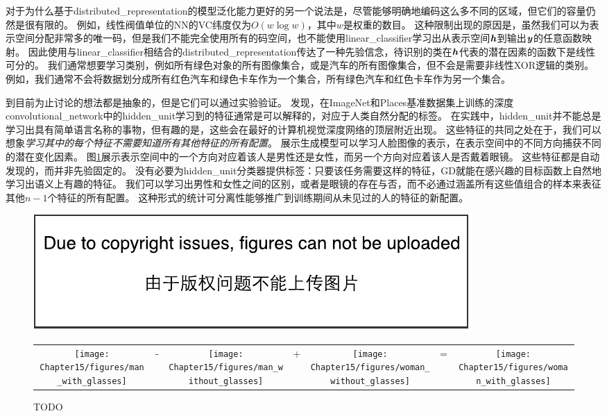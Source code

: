 对于为什么基于\gls{distributed_representation}的模型泛化能力更好的另一个说法是，尽管能够明确地编码这么多不同的区域，但它们的容量仍然是很有限的。
例如，线性阀值单位的\gls{NN}的VC纬度仅为$O(w\log w)$，其中$w$是权重的数目\citep{sontag1998vc}。
这种限制出现的原因是，虽然我们可以为表示空间分配非常多的唯一码，但是我们不能完全使用所有的码空间，也不能使用\gls{linear_classifier}学习出从表示空间$\boldsymbol{\mathit{h}}$到输出$\boldsymbol{\mathit{y}}$的任意函数映射。
因此使用与\gls{linear_classifier}相结合的\gls{distributed_representation}传达了一种先验信念，待识别的类在$\boldsymbol{\mathit{h}}$代表的潜在因素的函数下是线性可分的。
我们通常想要学习类别，例如所有绿色对象的所有图像集合，或是汽车的所有图像集合，但不会是需要非线性XOR逻辑的类别。
例如，我们通常不会将数据划分成所有红色汽车和绿色卡车作为一个集合，所有绿色汽车和红色卡车作为另一个集合。


到目前为止讨论的想法都是抽象的，但是它们可以通过实验验证。
\cite{Zhou-et-al-ICLR2015}发现，在ImageNet和Places基准数据集上训练的深度\gls{convolutional_network}中的\gls{hidden_unit}学习到的特征通常是可以解释的，对应于人类自然分配的标签。
在实践中，\gls{hidden_unit}并不能总是学习出具有简单语言名称的事物，但有趣的是，这些会在最好的计算机视觉深度网络的顶层附近出现。
这些特征的共同之处在于，我们可以想象\emph{学习其中的每个特征不需要知道所有其他特征的所有配置}。
\cite{radford2015unsupervised}展示生成模型可以学习人脸图像的表示，在表示空间中的不同方向捕获不同的潜在变化因素。
图\ref{fig:chap15_generative_glasses}展示表示空间中的一个方向对应着该人是男性还是女性，而另一个方向对应着该人是否戴着眼镜。
这些特征都是自动发现的，而并非先验固定的。
没有必要为\gls{hidden_unit}分类器提供标签：只要该任务需要这样的特征，\gls{GD}就能在感兴趣的目标函数上自然地学习出语义上有趣的特征。
我们可以学习出男性和女性之间的区别，或者是眼镜的存在与否，而不必通过涵盖所有这些值组合的样本来表征其他$n-1$个特征的所有配置。
这种形式的统计可分离性能够推广到训练期间从未见过的人的特征的新配置。

\begin{figure}[!htb]
\ifOpenSource
\centerline{\includegraphics{figure.pdf}}
\else
\begin{tabular}{ccccccc}
\texttt{[image: Chapter15/figures/man\_with\_glasses]} &
- &
\texttt{[image: Chapter15/figures/man\_without\_glasses]} &
+ &
\texttt{[image: Chapter15/figures/woman\_without\_glasses]} &
= &
\texttt{[image: Chapter15/figures/woman\_with\_glasses]}
\end{tabular}
\fi
\caption{TODO}
\label{fig:chap15_generative_glasses}
\end{figure}



